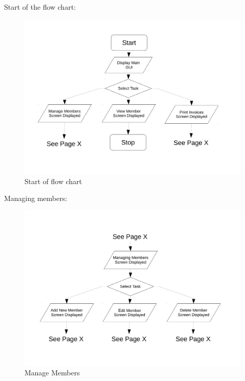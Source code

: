 Start of the flow chart:
\begin{figure}[H]
\includegraphics[width=\textwidth]{./Design/images/FC_start.pdf}
    \caption{Start of flow chart} \label{fig:Flow Chart Start}
\end{figure}

Managing members:
\begin{figure}[H]
\includegraphics[width=\textwidth]{./Design/images/FC_manage_members.pdf}
    \caption{Manage Members} \label{fig:Flow Chart Manage Members}
\end{figure}

